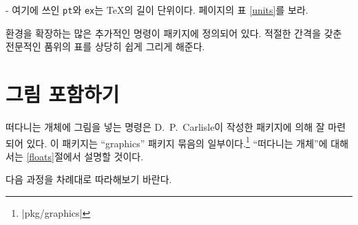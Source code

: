 \begin{adjustwidth}{0pt}{-\margheadwidth}
여기에 쓰인 \texttt{pt}와 \texttt{ex}는 \TeX 의 길이 단위이다. \pageref{units}페이지의 표 \ref{units}를 보라.

 환경을 확장하는 많은 추가적인 명령이  패키지에 정의되어 있다.
적절한 간격을 갖춘 전문적인 품위의 표를 상당히 쉽게 그리게 해준다.


\section{그림 포함하기}\label{eps}


떠다니는 개체에 그림을 넣는 명령은 D.~P.~Carlisle이 작성한  패키지에 의해 잘 마련되어 있다.
이 패키지는 ``graphics'' 패키지 묶음의 일부이다.\footnote{\CTAN|pkg/graphics|}
``떠다니는 개체''에 대해서는 \ref{floats}절에서 설명할 것이다.

다음 과정을 차례대로 따라해보기 바란다.

\enlargethispage*{2\onelineskip}


\end{adjustwidth}
